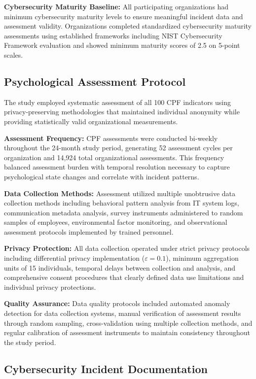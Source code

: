 \documentclass[10pt, twocolumn]{article}
\begin{document}
\textbf{Cybersecurity Maturity Baseline:} All participating organizations had minimum cybersecurity maturity levels to ensure meaningful incident data and assessment validity. Organizations completed standardized cybersecurity maturity assessments using established frameworks including NIST Cybersecurity Framework evaluation and showed minimum maturity scores of 2.5 on 5-point scales.

\subsection{Psychological Assessment Protocol}

The study employed systematic assessment of all 100 CPF indicators using privacy-preserving methodologies that maintained individual anonymity while providing statistically valid organizational measurements.

\textbf{Assessment Frequency:} CPF assessments were conducted bi-weekly throughout the 24-month study period, generating 52 assessment cycles per organization and 14,924 total organizational assessments. This frequency balanced assessment burden with temporal resolution necessary to capture psychological state changes and correlate with incident patterns.

\textbf{Data Collection Methods:} Assessment utilized multiple unobtrusive data collection methods including behavioral pattern analysis from IT system logs, communication metadata analysis, survey instruments administered to random samples of employees, environmental factor monitoring, and observational assessment protocols implemented by trained personnel.

\textbf{Privacy Protection:} All data collection operated under strict privacy protocols including differential privacy implementation ($\varepsilon = 0.1$), minimum aggregation units of 15 individuals, temporal delays between collection and analysis, and comprehensive consent procedures that clearly defined data use limitations and individual privacy protections.

\textbf{Quality Assurance:} Data quality protocols included automated anomaly detection for data collection systems, manual verification of assessment results through random sampling, cross-validation using multiple collection methods, and regular calibration of assessment instruments to maintain consistency throughout the study period.

\subsection{Cybersecurity Incident Documentation}
\end{document}
